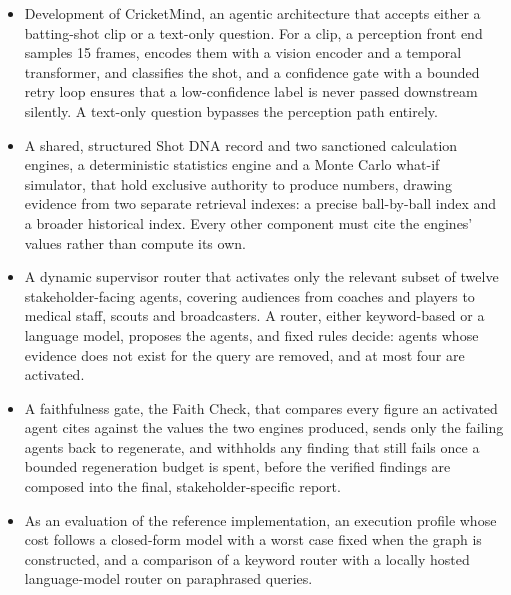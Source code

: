 \begin{itemize}
    \item Development of CricketMind, an agentic architecture that accepts either a batting-shot clip or a text-only question. For a clip, a perception front end samples 15 frames, encodes them with a vision encoder and a temporal transformer, and classifies the shot, and a confidence gate with a bounded retry loop ensures that a low-confidence label is never passed downstream silently. A text-only question bypasses the perception path entirely.
    \item A shared, structured Shot DNA record and two sanctioned calculation engines, a deterministic statistics engine and a Monte Carlo what-if simulator, that hold exclusive authority to produce numbers, drawing evidence from two separate retrieval indexes: a precise ball-by-ball index and a broader historical index. Every other component must cite the engines' values rather than compute its own.
    \item A dynamic supervisor router that activates only the relevant subset of twelve stakeholder-facing agents, covering audiences from coaches and players to medical staff, scouts and broadcasters. A router, either keyword-based or a language model, proposes the agents, and fixed rules decide: agents whose evidence does not exist for the query are removed, and at most four are activated.
    \item A faithfulness gate, the Faith Check, that compares every figure an activated agent cites against the values the two engines produced, sends only the failing agents back to regenerate, and withholds any finding that still fails once a bounded regeneration budget is spent, before the verified findings are composed into the final, stakeholder-specific report.
    \item As an evaluation of the reference implementation, an execution profile whose cost follows a closed-form model with a worst case fixed when the graph is constructed, and a comparison of a keyword router with a locally hosted language-model router on paraphrased queries.
\end{itemize}
